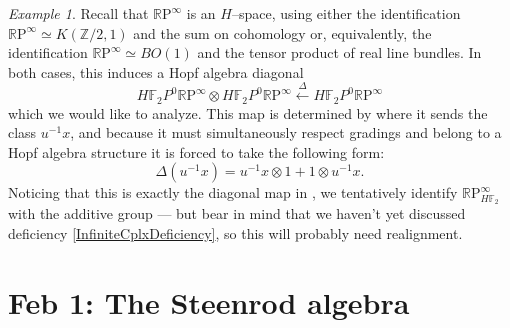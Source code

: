 \documentclass{article}
\newcommand{\Z}{\mathbb Z}
\newcommand{\F}{\mathbb F}
\newcommand{\R}{\mathbb R}
\newcommand{\RP}{\R\mathrm P}
\newcommand{\<}{\langle}
\renewcommand{\>}{\rangle}
\numberwithin{equation}{section}
\theoremstyle{plain}
\theoremstyle{definition}
\theoremstyle{remark}
\newtheorem{example}[equation]{Example}
\begin{document}
\begin{example}\label{RPExampleFaulty}
Recall that $\RP^\infty$ is an $H$--space, using either the identification $\RP^\infty \simeq K(\Z/2, 1)$ and the sum on cohomology or, equivalently, the identification $\RP^\infty \simeq BO(1)$ and the tensor product of real line bundles.  In both cases, this induces a Hopf algebra diagonal \[H\F_2P^0 \RP^\infty \otimes H\F_2P^0 \RP^\infty \xleftarrow\Delta H\F_2P^0 \RP^\infty\] which we would like to analyze.  This map is determined by where it sends the class $u^{-1} x$, and because it must simultaneously respect gradings and belong to a Hopf algebra structure it is forced to take the following form: \[\Delta(u^{-1} x) = u^{-1} x \otimes 1 + 1 \otimes u^{-1} x.\]  Noticing that this is exactly the diagonal map in , we tentatively identify $\RP^\infty_{H\F_2}$ with the additive group --- but bear in mind that we haven't yet discussed deficiency \ref{InfiniteCplxDeficiency}, so this will probably need realignment.
\end{example}








\section{Feb 1: The Steenrod algebra}
\end{document}
